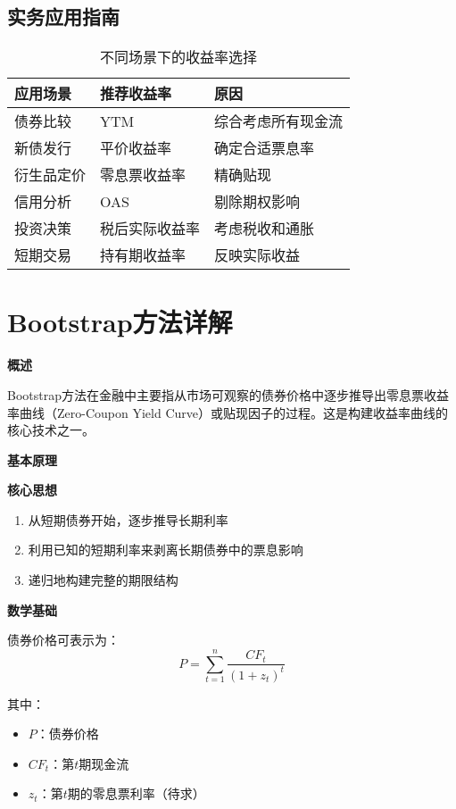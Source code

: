 \subsection{实务应用指南}

\begin{table}[h]
\centering
\caption{不同场景下的收益率选择}
\begin{tabular}{|l|l|l|}
\hline
\textbf{应用场景} & \textbf{推荐收益率} & \textbf{原因} \\
\hline
债券比较 & YTM & 综合考虑所有现金流 \\
新债发行 & 平价收益率 & 确定合适票息率 \\
衍生品定价 & 零息票收益率 & 精确贴现 \\
信用分析 & OAS & 剔除期权影响 \\
投资决策 & 税后实际收益率 & 考虑税收和通胀 \\
短期交易 & 持有期收益率 & 反映实际收益 \\
\hline
\end{tabular}
\end{table}

\section{Bootstrap方法详解}

\textbf{概述}

Bootstrap方法在金融中主要指从市场可观察的债券价格中逐步推导出零息票收益率曲线（Zero-Coupon Yield Curve）或贴现因子的过程。这是构建收益率曲线的核心技术之一。

\textbf{基本原理}

\textbf{核心思想}
\begin{enumerate}
    \item 从短期债券开始，逐步推导长期利率
    \item 利用已知的短期利率来剥离长期债券中的票息影响
    \item 递归地构建完整的期限结构
\end{enumerate}

\textbf{数学基础}

债券价格可表示为：
\begin{equation}
P = \sum_{t=1}^{n} \frac{CF_t}{(1+z_t)^t}
\end{equation}

其中：
\begin{itemize}
    \item $P$：债券价格
    \item $CF_t$：第$t$期现金流
    \item $z_t$：第$t$期的零息票利率（待求）
\end{itemize}

